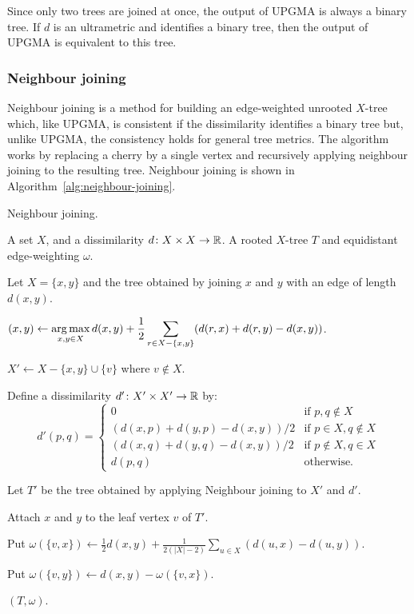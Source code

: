 Since only two trees are joined at once, the output of UPGMA is always a
binary tree.  If $d$ is an ultrametric and identifies a binary tree, then the
output of UPGMA is equivalent to this tree.

\subsubsection{Neighbour joining}
\label{sec:neighbour-joining}

Neighbour joining is a method for building an edge-weighted unrooted $X$-tree
which, like UPGMA, is consistent if the dissimilarity identifies a binary
tree but, unlike UPGMA, the consistency holds for general tree metrics.  The
algorithm works by replacing a cherry by a single vertex and recursively
applying neighbour joining to the resulting tree.  Neighbour joining is shown
in Algorithm~\ref{alg:neighbour-joining}.

\begin{algorithm}[h]
  \caption{Neighbour joining.}
  \label{alg:neighbour-joining}

  \begin{algorithmic}
    \Require A set $X$, and a dissimilarity $d \colon X \times X \to {\mathbb R}$.
    \Ensure  A rooted $X$-tree $T$ and equidistant edge-weighting $\omega$.

     Let $X = \{x,y\}$ and \Return the tree obtained by joining
    $x$ and $y$ with an edge of length $d(x,y)$.
    \EndIf

    \State $\displaystyle (x,y) \gets \operatorname*{arg\,max}_{x,y \in X} d(x,y) + \frac{1}{2}
    \sum_{r \in X - \{x,y\}} (d(r,x)+d(r,y)-d(x,y))$.

    \State $X' \gets X - \{x,y\} \cup \{v\}$ where $v \notin X$.

    \State Define a dissimilarity $d' \colon X' \times X' \to {\mathbb R}$ by:
    \begin{equation*}
      d'(p,q) =
      \begin{cases}
        0 & \text{if $p,q \notin X$} \\
        (d(x,p)+d(y,p)-d(x,y))/2 & \text{if $p \in X, q \notin X$} \\
        (d(x,q)+d(y,q)-d(x,y))/2 & \text{if $p \notin X, q \in X$} \\
        d(p,q) & \text{otherwise.}
      \end{cases}
    \end{equation*}

    \State Let $T'$ be the tree obtained by applying Neighbour joining to $X'$
    and $d'$.

    \State Attach $x$ and $y$ to the leaf vertex $v$ of $T'$.

    \State Put $\displaystyle \omega(\{v,x\}) \gets \frac{1}{2} d(x,y) +
    \frac{1}{2(|X|-2)} \sum_{u \in X} (d(u,x)-d(u,y))$.

    \State Put $\omega(\{v,y\}) \gets d(x,y) - \omega(\{v,x\})$.

    \State \Return $(T,\omega)$.
  \end{algorithmic}
\end{algorithm}

